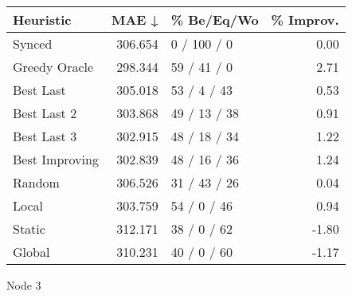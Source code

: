 \begin{tabular}{lrlr}
\toprule
\textbf{Heuristic} & \textbf{MAE ↓} & \textbf{\% Be/Eq/Wo} & \textbf{\% Improv.} \\
\midrule
            Synced &        306.654 &          0 / 100 / 0 &                0.00 \\
     Greedy Oracle &        298.344 &          59 / 41 / 0 &                2.71 \\
         Best Last &        305.018 &          53 / 4 / 43 &                0.53 \\
       Best Last 2 &        303.868 &         49 / 13 / 38 &                0.91 \\
       Best Last 3 &        302.915 &         48 / 18 / 34 &                1.22 \\
    Best Improving &        302.839 &         48 / 16 / 36 &                1.24 \\
            Random &        306.526 &         31 / 43 / 26 &                0.04 \\
             Local &        303.759 &          54 / 0 / 46 &                0.94 \\
            Static &        312.171 &          38 / 0 / 62 &               -1.80 \\
            Global &        310.231 &          40 / 0 / 60 &               -1.17 \\
\bottomrule
\end{tabular}
\caption{Node 3}
\label{tab:iid_lr05_le2_bs4_3}
